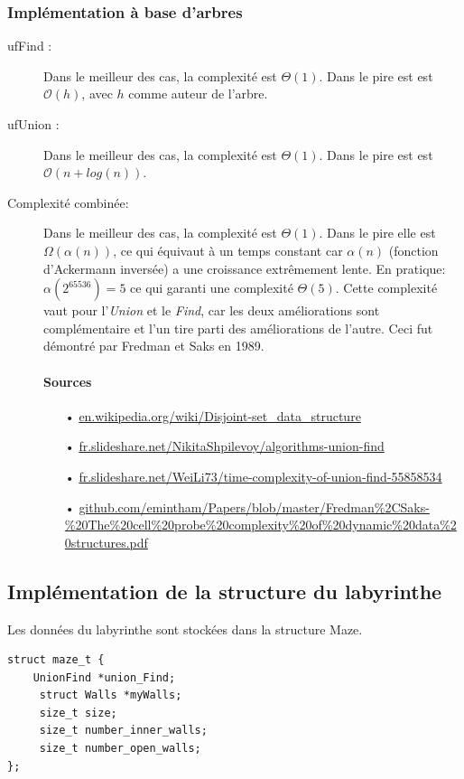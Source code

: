 \documentclass[10pt]{article}
\begin{document}
\subsubsection{Implémentation à base d'arbres}
\begin{description}
\item[ufFind :] Dans le meilleur des cas, la complexité est $\Theta(1)$. Dans le pire est est $\mathcal{O}(h)$, avec $h$ comme auteur de l'arbre. 
\item[ufUnion :] Dans le meilleur des cas, la complexité est $\Theta(1)$. Dans le pire est est $\mathcal{O}(n + log(n))$.
\item[Complexité combinée:] Dans le meilleur des cas, la complexité est $\Theta(1)$. Dans le pire elle est $\Omega( \alpha(n))$, ce qui équivaut à un temps constant car $\alpha(n)$ (fonction d'Ackermann inversée) a une croissance extrêmement lente. En pratique: $\alpha(2^{65536}) = 5$ ce qui garanti une complexité $\Theta(5)$. Cette complexité vaut pour l'\emph{Union} et le \emph{Find}, car les deux améliorations sont complémentaire et l'un tire parti des améliorations de l'autre. Ceci fut démontré par Fredman et Saks en 1989.

\paragraph{Sources} 
\begin{itemize}
\item[•] \url{en.wikipedia.org/wiki/Disjoint-set_data_structure}
\item[•] \url{fr.slideshare.net/NikitaShpilevoy/algorithms-union-find}
\item[•] \url{fr.slideshare.net/WeiLi73/time-complexity-of-union-find-55858534}
\item[•] \url{github.com/emintham/Papers/blob/master/Fredman%2CSaks-%20The%20cell%20probe%20complexity%20of%20dynamic%20data%20structures.pdf}
\end{itemize}

\end{description}
\subsection{Implémentation de la structure du labyrinthe}
Les données du labyrinthe sont stockées dans la structure Maze.
\begin{lstlisting}[style=CStyle]
struct maze_t {
    UnionFind *union_Find;
     struct Walls *myWalls;
     size_t size;
     size_t number_inner_walls;
     size_t number_open_walls;
};
\end{lstlisting}
\end{document}
